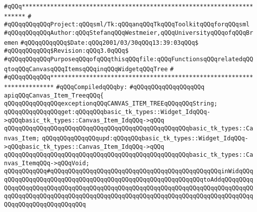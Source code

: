 \label{src/lib/tk/src/c_item_tree.api}
\verb|#qQQq***********************************************************************|\newline
\verb|#|\newline
\verb|#qQQqqQQqqQQqProject:qQQqsml/Tk:qQQqanqQQqTkqQQqToolkitqQQqforqQQqsml|\newline
\verb|#qQQqqQQqqQQqAuthor:qQQqStefanqQQqWestmeier,qQQqUniversityqQQqofqQQqBremen|\newline
\verb|#qQQqqQQqqQQq$Date:qQQq2001/03/30qQQq13:39:03qQQq$|\newline
\verb|#qQQqqQQqqQQq$Revision:qQQq3.0qQQq$|\newline
\verb|#qQQqqQQqqQQqPurposeqQQqofqQQqthisqQQqfile:qQQqFunctionsqQQqrelatedqQQqtoqQQqCanvasqQQqItemsqQQqinqQQqWidgetqQQqTree|\newline
\verb|#|\newline
\verb|#qQQqqQQqqQQq***********************************************************************|\newline
\newline
\verb|#qQQqCompiledqQQqby:|\newline
\verb|#qQQqqQQqqQQqqQQqqQQq|\newline
\newline
\verb|apiqQQqCanvas_Item_TreeqQQq{|\newline
\newline
\verb|qQQqqQQqqQQqqQQqexceptionqQQqCANVAS_ITEM_TREEqQQqqQQqString;|\newline
\newline
\verb|qQQqqQQqqQQqqQQqget:qQQqqQQqbasic_tk_types::Widget_IdqQQq->qQQqbasic_tk_types::Canvas_Item_IdqQQq->qQQq|\newline
\verb|qQQqqQQqqQQqqQQqqQQqqQQqqQQqqQQqqQQqqQQqqQQqqQQqqQQqbasic_tk_types::Canvas_Item;|\newline
\verb|qQQqqQQqqQQqqQQqupd:qQQqqQQqbasic_tk_types::Widget_IdqQQq->qQQqbasic_tk_types::Canvas_Item_IdqQQq->qQQq|\newline
\verb|qQQqqQQqqQQqqQQqqQQqqQQqqQQqqQQqqQQqqQQqqQQqqQQqqQQqbasic_tk_types::Canvas_ItemqQQq->qQQqVoid;|\newline
\newline
\verb|qQQqqQQqqQQq#qQQqqQQqqQQqqQQqqQQqqQQqqQQqqQQqqQQqqQQqqQQqqQQqinWidqQQqqQQqqQQqqQQqqQQqqQQqqQQqqQQqqQQqqQQqqQQqqQQqqQQqqQQqqQQqtoAddqQQqqQQqqQQqqQQqqQQqqQQqqQQqqQQqqQQqqQQqqQQqqQQqqQQqqQQqqQQqqQQqqQQqqQQqqQQqqQQqqQQqqQQqqQQqqQQqqQQqqQQqqQQqqQQqqQQqqQQqqQQqqQQqqQQqqQQqqQQqqQQqqQQqqQQqqQQqqQQqqQQqqQQqqQQq|\newline
